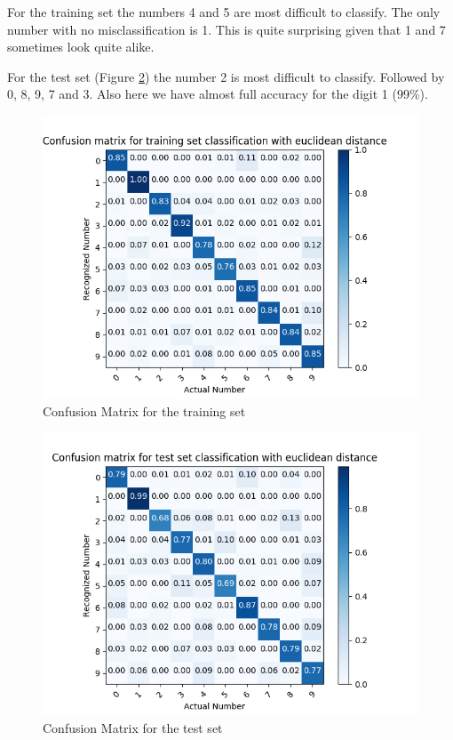 \documentclass{article}
\begin{document}
For the training set the numbers 4 and 5 are most difficult to classify. The only number with no misclassification is 1. This is quite surprising given that 1 and 7 sometimes look quite alike.

For the test set (Figure \ref{fig:cftest}) the number 2 is most difficult to classify. Followed by 0, 8, 9, 7 and 3. Also here we have almost full accuracy for the digit 1 (99\%).




\begin{figure}[H]
\centering
\includegraphics[width=0.9\linewidth]{img/TrainingSetCMeuclidean.png}
\caption{Confusion Matrix for the training set}
\label{fig:cftrain}
\end{figure}
\begin{figure}[H]
\centering
\includegraphics[width=0.9\linewidth]{img/TestSetCMeuclidean.png}
\caption{Confusion Matrix for the test set}
\label{fig:cftest}
\end{figure}
\end{document}
